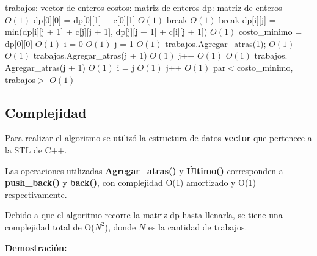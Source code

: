 \documentclass[a4paper, 10pt, twoside]{article}
\newenvironment{pseudo}[1][]{%
    \vspace{0.5em}%
    \begin{algorithmic}%
}
{%
    \end{algorithmic}%
    \vspace{0.5em}%
}
\newcommand{\Ode}[1]{\hfill $O(#1)$}
\begin{document}
\begin{pseudo}

\State trabajos: vector de enteros
\State costos: matriz de enteros
\State dp: matriz de enteros
\\
                             \Ode{1}
                \State dp[0][0] = dp[0][1] + c[0][1]  \Ode{1}
                \State break                          
            \EndIf
                                           \Ode{1}
                \State break
            \EndIf
            \State dp[i][j] = min(dp[i][j + 1] + c[j][j + 1], dp[j][j + 1] + c[i][j + 1])                          \Ode{1}
        \EndFor
    \EndFor
    \State costo\_minimo = dp[0][0]                    \Ode{1}
    \State i = 0                                       \Ode{1}
    \State j = 1                                       \Ode{1}
    \State trabajos$.$Agregar\_atras(1);
            \Ode{1}
                \Ode{1}
            \State trabajos$.$Agregar\_atras(j + 1)    \Ode{1}
            \State j++                                 \Ode{1}
            \EndIf
        \Else
                \Ode{1}
            \State trabajos$.$Agregar\_atras(j + 1)    \Ode{1}
            \State i = j                               \Ode{1}  
            \State j++                                 \Ode{1}
            \EndIf
        \EndIf
    \EndWhile
    \Return par$<$costo\_minimo, trabajos$>$ \Ode{1}
    \EndProcedure
\end{pseudo}


\subsection{Complejidad}

Para realizar el algoritmo se utilizó la estructura de datos \textbf{vector} que pertenece a la STL de C++.

Las operaciones utilizadas \textbf{Agregar\_atras()} y \textbf{Último()} corresponden a \textbf{push\_back()} y \textbf{back()}, con complejidad O(1) amortizado y O(1) respectivamente.

Debido a que el algoritmo recorre la matriz dp hasta llenarla, se tiene una complejidad total de O($N^2$), donde $N$ es la cantidad de trabajos.

\textbf{Demostración: }
\end{document}
